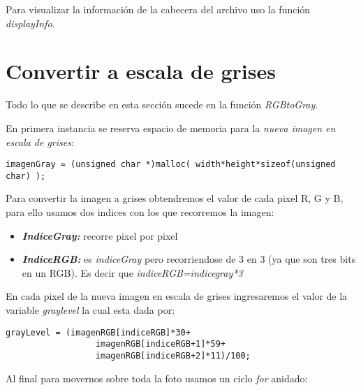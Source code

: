 \documentclass[11pt,a4paper]{article}
\begin{document}
Para visualizar la información de la cabecera del archivo uso la función \textit{displayInfo}.

\section{Convertir a escala de grises}

Todo lo que se describe en esta sección sucede en la función \textit{RGBtoGray}.

En primera instancia se reserva espacio de memoria para la \textit{nueva imagen en escala de grises}:

\lstset{language=C, breaklines=true, basicstyle=\footnotesize}
\lstset{numbers=left, numberstyle=\tiny, stepnumber=1, numbersep=-2pt}
\begin{lstlisting}[frame=single]
  imagenGray = (unsigned char *)malloc( width*height*sizeof(unsigned char) );
\end{lstlisting}


Para convertir la imagen a grises obtendremos el valor de cada pixel R, G y B, para ello usamos dos indices con los que recorremos la imagen:

\begin{itemize}
\item \textit{\textbf{IndiceGray:}} recorre pixel por pixel
\item \textit{\textbf{IndiceRGB:}} es \textit{indiceGray} pero recorriendose de 3 en 3 (ya que son tres bits en un RGB). Es decir que \textit{indiceRGB=indicegray*3} 
\end{itemize}


En cada pixel de la nueva imagen en escala de grises ingresaremos el valor de la variable \textit{graylevel} la cual esta dada por:

\lstset{language=C, breaklines=true, basicstyle=\footnotesize}
\lstset{numbers=left, numberstyle=\tiny, stepnumber=1, numbersep=-2pt}
\begin{lstlisting}[frame=single]
  grayLevel = (imagenRGB[indiceRGB]*30+ 
                  imagenRGB[indiceRGB+1]*59+
                  imagenRGB[indiceRGB+2]*11)/100;

\end{lstlisting}


Al final para movernos sobre toda la foto usamos un ciclo \textit{for} anidado:
\end{document}

